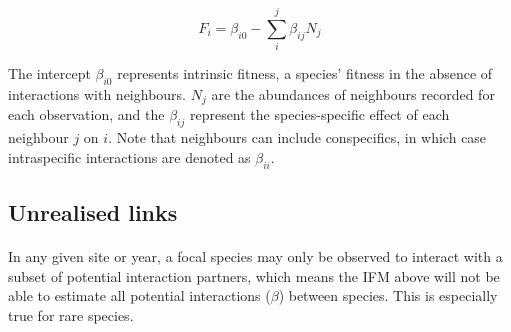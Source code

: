 \documentclass[a4,12pt]{article}
\begin{document}
        \begin{equation}
        F_{i} = \beta_{i0} - \sum_{i}^{j} \beta_{ij} N_{j}
        \label{ifm}
        \end{equation}
        
        The intercept $\beta_{i0}$ represents intrinsic fitness, a species' fitness in the absence of interactions with neighbours. $N_{j}$ are the abundances of neighbours recorded for each observation, and the $\beta_{ij}$ represent the species-specific effect of each neighbour $j$ on $i$. Note that neighbours can include conspecifics, in which case intraspecific interactions are denoted as $\beta_{ii}$.
              
    \subsection{Unrealised links}
    
        \paragraph{}
        In any given site or year, a focal species may only be observed to interact with a subset of potential interaction partners, which means the IFM above will not be able to estimate all potential interactions ($\beta$) between species. This is especially true for rare species. %
        
        
        
\end{document}
